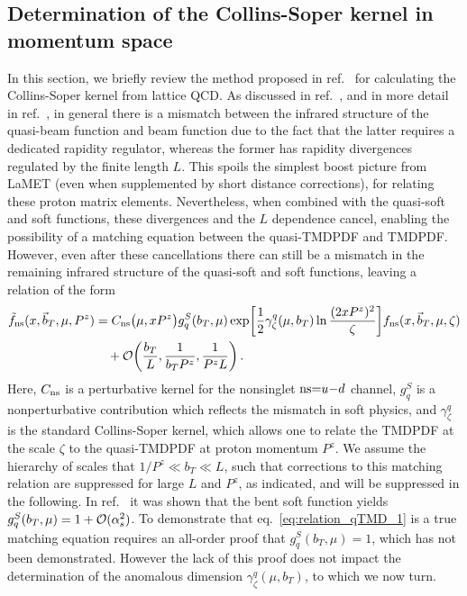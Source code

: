 \documentclass[11pt,a4paper]{article}
\DeclareRobustCommand{\eq}[1]{eq.~\eqref{eq:#1}}
\DeclareRobustCommand{\mycite}[1]{ref.~\cite{#1}}
\newcommand{\cO}{\mathcal{O}}
\newcommand{\nn}{\nonumber}
\newcommand{\bt}{\vec b_T}
\newcommand{\ns}{{\rm ns}}
\begin{document}
\subsection{Determination of the Collins-Soper kernel in momentum space}
\label{sec:CS_momentum_space}

In this section, we briefly review the method proposed in \mycite{Ebert:2018gzl} for calculating the Collins-Soper kernel from lattice QCD.
As discussed in \mycite{Ebert:2018gzl}, and in more detail in \mycite{Ebert:2019okf}, in general there is a mismatch between the infrared structure of the quasi-beam function and beam function due to the fact that the latter requires a dedicated rapidity regulator, whereas the former has rapidity divergences regulated by the finite length $L$. This spoils the simplest boost picture from LaMET (even when supplemented by short distance corrections), for relating these proton matrix elements.  Nevertheless, when combined with the quasi-soft and soft functions, these divergences and the $L$ dependence cancel, enabling the possibility of a matching equation between the quasi-TMDPDF and TMDPDF. However, even after these cancellations there can still be a mismatch in the remaining infrared structure of the quasi-soft and soft functions, leaving a relation of the form
\begin{align} \label{eq:relation_qTMD_1}
 \tilde f_{\ns}(x, \bt, \mu, P^z) &
 = C_{\ns}\bigl(\mu, x P^z\bigr) g^S_{q}(b_T, \mu)
   \exp\biggl[ \frac12  \gamma_\zeta^q(\mu, b_T) \ln\frac{(2 x P^z)^2}{\zeta} \biggr]
   f_{\ns}(x, \bt, \mu, \zeta)
 \nn\\&\quad
 + \cO\biggl(\frac{b_T}{L}, \frac{1}{b_T P^z}, \frac{1}{P^z L}\biggr)
\,.\end{align}
Here, $C_{\ns}$ is a perturbative kernel for the nonsinglet $\ns{=}u{-}d$ channel,
$g_q^S$ is a nonperturbative contribution which reflects the mismatch in soft physics,
and $\gamma_\zeta^q$ is the standard Collins-Soper kernel, which allows one to relate the TMDPDF
at the scale $\zeta$ to the quasi-TMDPDF at proton momentum $P^z$.
We assume the hierarchy of scales that $1/P^z \ll b_T \ll L$, such that
corrections to this matching relation are suppressed for large $L$ and $P^z$,
as indicated, and will be suppressed in the following.
In \mycite{Ebert:2019okf} it was shown that the bent soft function yields $g^S_{q}(b_T,\mu) = 1 + {\cal O}(\alpha_s^2)$. To demonstrate that \eq{relation_qTMD_1} is a true matching equation requires an all-order proof that $g^S_{q}(b_T,\mu) = 1$, which has not been demonstrated. However the lack of this proof does not impact the determination of the anomalous dimension $\gamma_\zeta^q(\mu,b_T)$, to which we now turn. 
\end{document}

